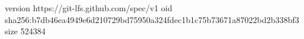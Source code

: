 version https://git-lfs.github.com/spec/v1
oid sha256:b7db46ea4949e6d210729bd75950a324fdec1b1c75b73671a87022bd2b338bf3
size 524384

